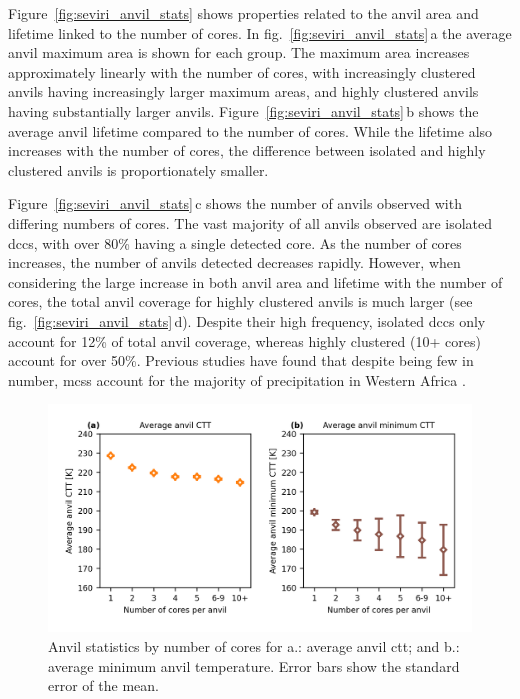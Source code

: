 Figure~\ref{fig:seviri_anvil_stats} shows properties related to the anvil area and lifetime linked to the number of cores. 
In fig.~\ref{fig:seviri_anvil_stats}\,a the average anvil maximum area is shown for each group. 
The maximum area increases approximately linearly with the number of cores, with increasingly clustered anvils having increasingly larger maximum areas, and highly clustered anvils having substantially larger anvils. 
Figure~\ref{fig:seviri_anvil_stats}\,b shows the average anvil lifetime compared to the number of cores. 
While the lifetime also increases with the number of cores, the difference between isolated and highly clustered anvils is proportionately smaller.



Figure~\ref{fig:seviri_anvil_stats}\,c shows the number of anvils observed with differing numbers of cores. 
The vast majority of all anvils observed are isolated \acrshort{dcc}s, with over 80\% having a single detected core. 
As the number of cores increases, the number of anvils detected decreases rapidly. 
However, when considering the large increase in both anvil area and lifetime with the number of cores, the total anvil coverage for highly clustered anvils is much larger (see fig.~\ref{fig:seviri_anvil_stats}\,d). 
Despite their high frequency, isolated \acrshort{dcc}s only account for 12\% of total anvil coverage, whereas highly clustered (10+ cores) account for over 50\%. 
Previous studies have found that despite being few in number, \acrshort{mcs}s account for the majority of precipitation in Western Africa \citep{vizy_understanding_2019}.

\begin{figure}[btp]
    \includegraphics[width=\textwidth]{figures/chapter4_10.png}
    \caption[
    Anvil statistics by number of cores for average anvil \acrshort{ctt} and average minimum anvil temperature
    ]{
    Anvil statistics by number of cores for a.: average anvil \acrshort{ctt}; and b.: average minimum anvil temperature. Error bars show the standard error of the mean.
    }
    \label{fig:seviri_anvil_ctt_stats}
\end{figure}



